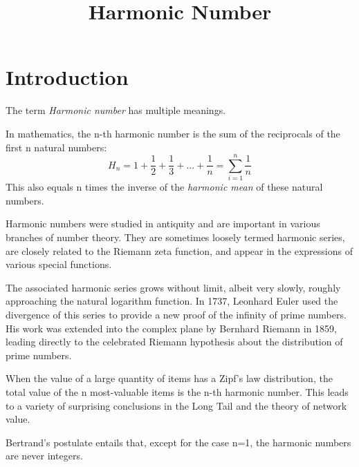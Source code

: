 \documentclass{article}
\title{Harmonic Number}
\begin{document}
\date{\vspace{-5ex}}
\maketitle
\section{Introduction}
\begin{flushleft}
The term \emph{Harmonic number} has multiple meanings.
\end{flushleft}
In mathematics, the n-th harmonic number is the sum of the reciprocals of the first n natural numbers:
\begin{equation}
H_{n}=1+\frac{1}{2}+\frac{1}{3}+...+\frac{1}{n}=\sum_{i=1}^n \frac{1}{n} \label{nth harmonic number}
\end{equation}
This also equals n times the inverse of the \emph{harmonic mean} of these natural numbers.

Harmonic numbers were studied in antiquity and are important in various branches of number theory. They are sometimes loosely termed harmonic series, are closely related to the Riemann zeta function, and appear in the expressions of various special functions.

The associated harmonic series grows without limit, albeit very slowly, roughly approaching the natural logarithm function. In 1737, Leonhard Euler used the divergence of this series to provide a new proof of the infinity of prime numbers. His work was extended into the complex plane by Bernhard Riemann in 1859, leading directly to the celebrated Riemann hypothesis about the distribution of prime numbers.

When the value of a large quantity of items has a Zipf's law distribution, the total value of the n most-valuable items is the n-th harmonic number. This leads to a variety of surprising conclusions in the Long Tail and the theory of network value.

Bertrand's postulate entails that, except for the case n=1, the harmonic numbers are never integers.
\\
\end{document}
